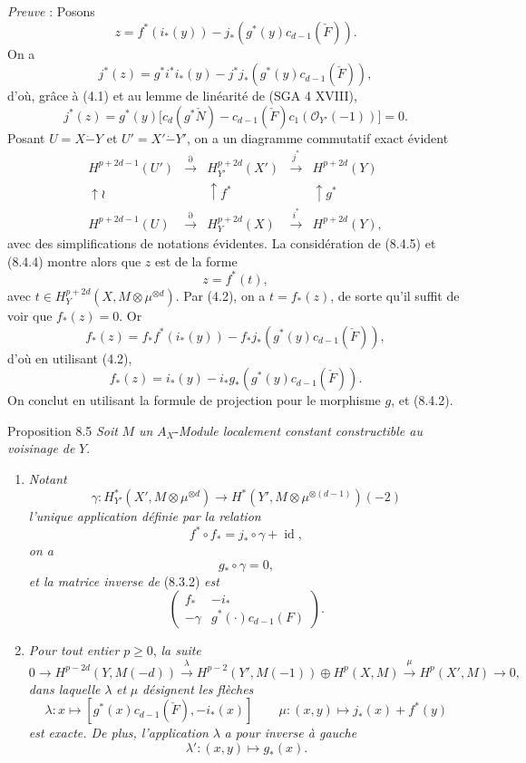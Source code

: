 \emph{Preuve} : Posons
\[
z=f^*(i_*(y))-j_*(g^*(y)c_{d-1}(\check F)).
\]
On a
\[
j^*(z)=g^*i^*i_*(y)-j^*j_*(g^*(y)c_{d-1}(\check F)),
\]
d'où, grâce à (4.1) et au lemme de linéarité de (SGA 4 XVIII),
\[
j^*(z)=g^*(y)\bigl[c_d(g^*\check N)-c_{d-1}(\check F)c_1(\mathcal{O}_{Y'}(-1))\bigr]=0.
\tag{8.4.4}
\]
Posant $U=X\mathbin{\dot{-}}Y$ et $U'=X'\mathbin{\dot{-}}Y'$, on a un diagramme commutatif exact évident
\[
\begin{array}{ccccc}
H^{p+2d-1}(U')&\xrightarrow{\partial}&H^{p+2d}_{Y'}(X')&\xrightarrow{j^*}&H^{p+2d}(Y)\\
\uparrow\wr&&\uparrow f^*&&\uparrow g^*\\
H^{p+2d-1}(U)&\xrightarrow{\partial}&H_Y^{p+2d}(X)&\xrightarrow{i^*}&H^{p+2d}(Y),
\end{array}
\tag{8.4.5}
\]
avec des simplifications de notations évidentes. La considération de (8.4.5) et (8.4.4) montre alors que $z$ est de la forme
\[
z=f^*(t),
\]
avec $t\in H_Y^{p+2d}(X,M\otimes\mu^{\otimes d})$. Par (4.2), on a $t=f_*(z)$, de sorte qu'il suffit de voir que $f_*(z)=0$. Or
\[
f_*(z)=f_*f^*(i_*(y))-f_*j_*(g^*(y)c_{d-1}(\check F)),
\]
d'où en utilisant (4.2),
\[
f_*(z)=i_*(y)-i_*g_*(g^*(y)c_{d-1}(\check F)).
\]
On conclut en utilisant la formule de projection pour le morphisme $g$, et (8.4.2).

\begin{statement}{Proposition 8.5}
\emph{Soit} $M$ \emph{un} $A_X$-\emph{Module localement constant constructible au voisinage de} $Y$.
\begin{enumerate}[label=\alph*)]
\item \emph{Notant}
\[
\gamma:H_{Y'}^*(X',M\otimes\mu^{\otimes d})\to
H^*(Y',M\otimes\mu^{\otimes(d-1)})(-2)
\]
\emph{l'unique application définie par la relation}
\[
f^*\circ f_* = j_*\circ\gamma+\operatorname{id},
\tag{8.5.1}
\]
\emph{on a}
\[
g_*\circ\gamma=0,
\tag{8.5.2}
\]
\emph{et la matrice inverse de} (8.3.2) \emph{est}
\[
\begin{pmatrix}
f_*&-i_*\\
-\gamma&g^*(\cdot)c_{d-1}(F)
\end{pmatrix}.
\tag{8.5.3}
\]
\item \emph{Pour tout entier} $p\ge0$, \emph{la suite}
\[
0\to H^{p-2d}(Y,M(-d))
\xrightarrow{\lambda}
H^{p-2}(Y',M(-1))\oplus H^p(X,M)
\xrightarrow{\mu}
H^p(X',M)\to0,
\]
\emph{dans laquelle} $\lambda$ \emph{et} $\mu$ \emph{désignent les flèches}
\[
\lambda : x\longmapsto [g^*(x)c_{d-1}(\check F),-i_*(x)]
\qquad
\mu : (x,y)\mapsto j_*(x)+f^*(y)
\]
\emph{est exacte. De plus, l'application} $\lambda$ \emph{a pour inverse à gauche}
\[
\lambda' : (x,y)\longmapsto g_*(x).
\]
\end{enumerate}
\end{statement}

